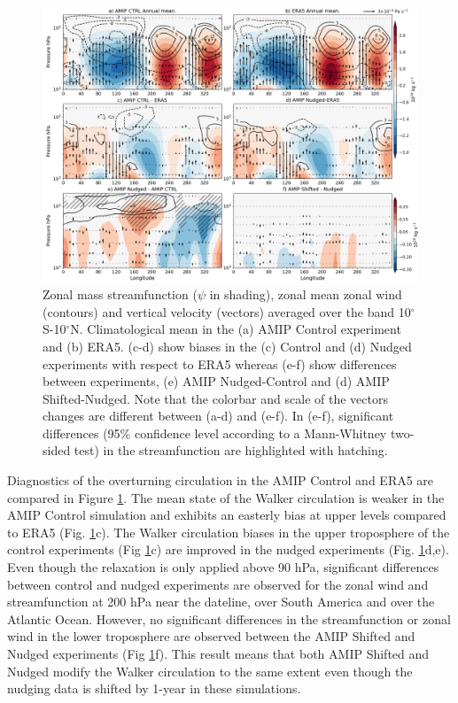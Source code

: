 \begin{figure}[t!]
\centering
 \includegraphics[width=\linewidth]{figures/suite_streamwalkerclim.png}
\caption[Walker in atmosphere-only experiments]{Zonal mass streamfunction ($\psi$ in shading), zonal mean zonal wind (contours) and vertical velocity (vectors) averaged over the band 10$^\circ$S-10$^\circ$N. Climatological mean in the (a) AMIP Control experiment and (b) ERA5. (c-d) show biases in the (c) Control and (d) Nudged experiments with respect to ERA5 whereas (e-f) show differences between experiments, (e) AMIP Nudged-Control and (d) AMIP Shifted-Nudged. Note that the colorbar and scale of the vectors changes are different between (a-d) and (e-f). In (e-f), significant differences (95\% confidence level according to a Mann-Whitney two-sided test) in the streamfunction are highlighted with hatching. }
\label{fig:walkeramip}
\end{figure}


Diagnostics of the overturning circulation in the AMIP Control and ERA5 are compared in Figure \ref{fig:walkeramip}. The mean state of the Walker circulation is weaker in the AMIP Control simulation and exhibits an easterly bias at upper levels compared to ERA5 (Fig. \ref{fig:walkeramip}c). The Walker circulation biases in the upper troposphere of the control experiments (Fig \ref{fig:walkeramip}c) are improved in the nudged experiments (Fig. \ref{fig:walkeramip}d,e). Even though the relaxation is only applied above 90 hPa, significant differences between control and nudged experiments are observed for the zonal wind and streamfunction at 200 hPa near the dateline, over South America and over the Atlantic Ocean. However, no significant differences in the streamfunction or zonal wind in the lower troposphere are observed between the AMIP Shifted and Nudged experiments (Fig \ref{fig:walkeramip}f). This result means that both AMIP Shifted and Nudged modify the Walker circulation to the same extent even though the nudging data is shifted by 1-year in these simulations.

